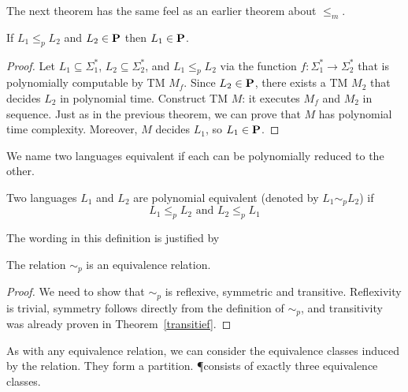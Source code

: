The next theorem has the same feel as an earlier theorem about
$\leq_m$.

\begin{theorem} \label{P_is_klein}
If $L_1  \leq_p  L_2$ and $L_2\in \P$ then $L_1 \in \P$.
\end{theorem}
\begin{proof} Let $L_1\subseteq \Sigma_1^*$, $L_2\subseteq \Sigma_2^*$, and $L_1
\leq_p L_2$ via the function $f: \Sigma_1^*\rightarrow \Sigma_2^*$ that is
polynomially computable by TM $M_f$. Since $L_2\in \P$, there exists a
TM $M_2$ that decides $L_2$ in polynomial time. Construct TM $M$: it
executes $M_f$ and $M_2$ in sequence. Just as in the previous theorem,
we can prove that $M$ has polynomial time complexity. Moreover, $M$
decides $L_1$, so $L_1\in \P$.
\end{proof}

We name two languages equivalent if each can be polynomially reduced
to the other.

\begin{definition}
Two languages $L_1$ and $L_2$ are polynomial equivalent (denoted by
$L_1\sim_p L_2$) if
\[ L_1 \leq_p  L_2 \mbox{ \ and \ } L_2  \leq_p  L_1\]
\end{definition}


The wording in this definition is justified by

\begin{theorem}
The relation $\sim_p$ is an equivalence relation.
\end{theorem}
\begin{proof} We need to show that $\sim_p$ is reflexive, symmetric
and transitive. Reflexivity is trivial, symmetry follows directly from
the definition of $\sim_p$, and transitivity was already proven in
Theorem~\ref{transitief}.
\end{proof}

As with any equivalence relation, we can consider the equivalence
classes induced by the relation. They form a partition. \P consists
of exactly three equivalence classes.

